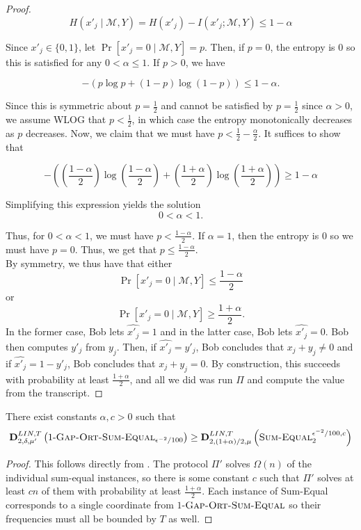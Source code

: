 \documentclass{toc}
\newcommand{\DlinT}{\ensuremath{\mathbf{D}^{LIN,T}}}
\newcommand{\sumequal}{\textsc{Sum-Equal} }
\newcommand{\gose}{\textsc{Gap-Ort-Sum-Equal}}
\begin{document}
\begin{proof}
$$H(x'_j \mid \mathcal{M},Y) = H(x'_j) - I(x'_j; \mathcal{M},Y) \le 1-\alpha$$

Since $x'_j \in \{0,1\}$, let $\Pr[x'_j = 0 \mid \mathcal{M},Y] = p$. Then, if $p=0$, the entropy is $0$ so this is satisfied for any $0 < \alpha \le 1$. If $p>0$, we have

$$-(p \log p + (1-p) \log (1-p))\le 1-\alpha.$$

Since this is symmetric about $p=\frac{1}{2}$ and cannot be satisfied by $p = \frac{1}{2}$ since $\alpha > 0$, we assume WLOG that $p < \frac{1}{2}$, in which case the entropy monotonically decreases as $p$ decreases. Now, we claim that we must have $p < \frac{1}{2}-\frac{\alpha}{2}$. It suffices to show that

$$ -\left(\left(\frac{1-\alpha}{2}\right) \log \left(\frac{1-\alpha}{2}\right) + \left(\frac{1+\alpha}{2}\right) \log \left(\frac{1+\alpha}{2}\right)\right) \ge 1-\alpha$$

Simplifying this expression yields the solution
$$0 < \alpha < 1.$$

Thus, for $0 < \alpha < 1$, we must have $p < \frac{1-\alpha}{2}$. If $\alpha=1$, then the entropy is $0$ so we must have $p=0$. Thus, we get that $p \le \frac{1-\alpha}{2}$.\\

By symmetry, we thus have that either
$$\Pr[x'_j = 0 \mid \mathcal{M},Y] \le \frac{1-\alpha}{2}$$
or
$$\Pr[x'_j = 0 \mid \mathcal{M},Y] \ge \frac{1+\alpha}{2}.$$
In the former case, Bob lets $\hat{x'_j} = 1$ and in the latter case, Bob lets $\hat{x'_j} = 0$. Bob then computes $y'_j$ from $y_j$. Then, if $\hat{x'_j} = y'_j$, Bob concludes that $x_j + y_j \ne 0$ and if $\hat{x'_j} = 1-y'_j$, Bob concludes that $x_j + y_j = 0$. By construction, this succeeds with probability at least $\frac{1+\alpha}{2}$, and all we did was run $\Pi$ and compute the value from the transcript.
\end{proof}


\begin{corollary}
{\color{black}There exist constants $\alpha,c > 0$ such that}
$$\DlinT_{2,\delta,\mu'}\left(1\text{-}\gose_{\epsilon^{-2}/100}\right) \ge \DlinT_{2,(1+\alpha)/2,\mu}\left(\sumequal^{\epsilon^{-2}/100,c}_2\right)$$
\end{corollary}

\begin{proof}
This follows directly from . The protocol $\Pi'$ solves $\Omega(n)$ of the individual sum-equal instances, so there is some constant $c$ such that $\Pi'$ solves at least $cn$ of them with probability at least $\frac{1+\alpha}{2}$. Each instance of Sum-Equal corresponds to a single coordinate from $1$-$\gose$ so their frequencies must all be bounded by $T$ as well.
\end{proof}
\end{document}

